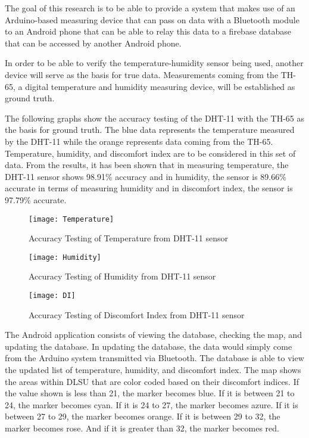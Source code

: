 The goal of this research is to be able to provide a system that makes use of an Arduino-based measuring device that can pass on data with a Bluetooth module to an Android phone that can be able to relay this data to a firebase database that can be accessed by another Android phone.

In order to be able to verify the temperature-humidity sensor being used, another device will serve as the basis for true data. Measurements coming from the TH-65, a digital temperature and humidity measuring device, will be established as ground truth.

The following graphs show the accuracy testing of the DHT-11 with the TH-65 as the basis for ground truth. The blue data represents the temperature measured by the DHT-11 while the orange represents data coming from the TH-65. Temperature, humidity, and discomfort index are to be considered in this set of data. From the results, it has been shown that in measuring temperature, the DHT-11 sensor shows 98.91\% accuracy and in humidity, the sensor is 89.66\% accurate in terms of measuring humidity and in discomfort index, the sensor is 97.79\% accurate. %

\begin{figure}[h]
\centering
\texttt{[image: Temperature]}
\caption{Accuracy Testing of Temperature from DHT-11 sensor}
\end{figure}

\begin{figure}[h]
\centering
\texttt{[image: Humidity]}
\caption{Accuracy Testing of Humidity from DHT-11 sensor}
\end{figure}

\begin{figure}[h]
\centering
\texttt{[image: DI]}
\caption{Accuracy Testing of Discomfort Index from DHT-11 sensor}
\end{figure}

The Android application consists of viewing the database, checking the map, and updating the database. In updating the database, the data would simply come from the Arduino system transmitted via Bluetooth. The database is able to view the updated list of temperature, humidity, and discomfort index. The map shows the areas within DLSU that are color coded based on their discomfort indices. If the value shown is less than 21, the marker becomes blue. If it is between 21 to 24, the marker becomes cyan. If it is 24 to 27, the marker becomes azure. If it is between 27 to 29, the marker becomes orange. If it is between 29 to 32, the marker becomes rose. And if it is greater than 32, the marker becomes red.

